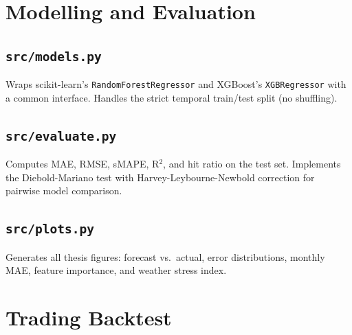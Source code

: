 \documentclass[11pt, a4paper, oneside]{report}
\begin{document}
\chapter{Modelling and Evaluation}

\section{\texttt{src/models.py}}

Wraps scikit-learn's \texttt{RandomForestRegressor} and XGBoost's
\texttt{XGBRegressor} with a common interface. Handles the strict
temporal train/test split (no shuffling).



\clearpage

\section{\texttt{src/evaluate.py}}

Computes MAE, RMSE, sMAPE, R$^2$, and hit ratio on the test set.
Implements the Diebold-Mariano test with Harvey-Leybourne-Newbold
correction for pairwise model comparison.



\clearpage

\section{\texttt{src/plots.py}}

Generates all thesis figures: forecast vs.\ actual, error distributions,
monthly MAE, feature importance, and weather stress index.



\clearpage

\chapter{Trading Backtest}
\end{document}
